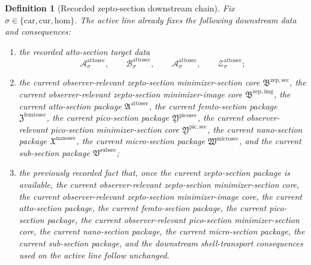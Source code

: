 \documentclass[11pt]{article}
\newcommand{\Car}{\mathrm{car}}
\newcommand{\Cur}{\mathrm{cur}}
\newcommand{\Hom}{\mathrm{hom}}
\newcommand{\SubSectionPackage}{\mathfrak V^{\mathrm{subsec}}}
\newcommand{\MicroSectionPackage}{\mathfrak W^{\mathrm{microsec}}}
\newcommand{\NanoSectionPackage}{\mathfrak X^{\mathrm{nanosec}}}
\newcommand{\PicoSectionPackage}{\mathfrak Y^{\mathrm{picosec}}}
\newcommand{\PicoMinSectionCore}{\mathfrak Y^{\mathrm{pic,sec}}}
\newcommand{\FemtoSectionPackage}{\mathfrak Z^{\mathrm{femtosec}}}
\newcommand{\AttoSectionPackage}{\mathfrak A^{\mathrm{attosec}}}
\newcommand{\AttoSectionSpace}[1]{\mathcal A_{#1}^{\mathrm{attosec}}}
\newcommand{\AttoSectionBody}[1]{\mathcal B_{#1}^{\mathrm{attosec}}}
\newcommand{\AttoSectionFunctional}[1]{\mathscr A_{#1}^{\mathrm{attosec}}}
\newcommand{\AttoSectionShell}[1]{\mathcal Z_{#1}^{\mathrm{attosec}}}
\newcommand{\ZeptoImageCore}{\mathfrak B^{\mathrm{zep,img}}}
\newcommand{\ZeptoMinSectionCore}{\mathfrak B^{\mathrm{zep,sec}}}
\newtheorem{definition}{Definition}
\begin{document}
\begin{definition}[Recorded zepto-section downstream chain]
\label{def:downstream}
Fix \(\sigma\in\{\Car,\Cur,\Hom\}\). The active line already fixes the following downstream data and consequences:
\begin{enumerate}
    \item the recorded atto-section target data
    \[
    \AttoSectionSpace{\sigma},\qquad
    \AttoSectionBody{\sigma},\qquad
    \AttoSectionFunctional{\sigma},\qquad
    \AttoSectionShell{\sigma};
    \]
    \item the current observer-relevant zepto-section minimizer-section core \(\ZeptoMinSectionCore\), the current observer-relevant zepto-section minimizer-image core \(\ZeptoImageCore\), the current atto-section package \(\AttoSectionPackage\), the current femto-section package \(\FemtoSectionPackage\), the current pico-section package \(\PicoSectionPackage\), the current observer-relevant pico-section minimizer-section core \(\PicoMinSectionCore\), the current nano-section package \(\NanoSectionPackage\), the current micro-section package \(\MicroSectionPackage\), and the current sub-section package \(\SubSectionPackage\);
    \item the previously recorded fact that, once the current zepto-section package is available, the current observer-relevant zepto-section minimizer-section core, the current observer-relevant zepto-section minimizer-image core, the current atto-section package, the current femto-section package, the current pico-section package, the current observer-relevant pico-section minimizer-section core, the current nano-section package, the current micro-section package, the current sub-section package, and the downstream shell-transport consequences used on the active line follow unchanged.
\end{enumerate}
\end{definition}
\end{document}
